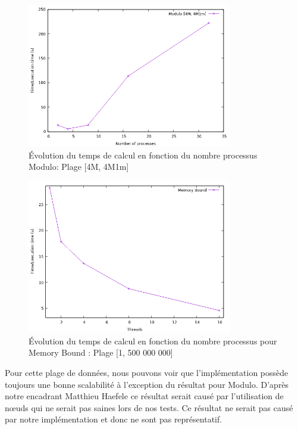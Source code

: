 \begin{figure}
            \centering 
            \includegraphics[width=0.8\textwidth]{Modulo_4M.png}
        \caption[ Évolution du temps de calcul en fonction du nombre processus]
        {\small Évolution du temps de calcul en fonction du nombre processus Modulo: Plage [4M, 4M1m]} 
        \label{fig:5}
\end{figure}
	
\begin{figure}
        \centering 
            \includegraphics[width=0.8\textwidth]{Memory.png}
        \caption[Évolution du temps de calcul en fonction du nombre processus]
        {\small Évolution du temps de calcul en fonction du nombre processus pour Memory Bound : Plage [1, 500 000 000]} 
        \label{fig:6}
\end{figure}

	Pour cette plage de données, nous pouvons voir que l'implémentation possède toujours une bonne scalabilité à l'exception du résultat pour Modulo. D'après notre encadrant Matthieu Haefele ce résultat serait causé par l'utilisation de nœuds qui ne serait pas saines lors de nos tests. Ce résultat ne serait pas causé par notre implémentation et donc ne sont pas représentatif.\\
	

